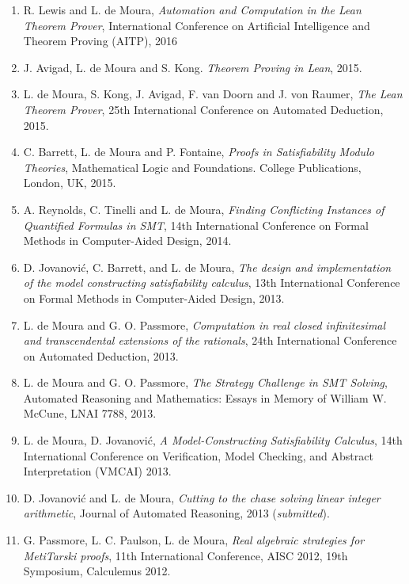 \documentclass{article}
\begin{document}
\begin{enumerate}
\item R. Lewis and L. de Moura,
      {\em Automation and Computation in the Lean Theorem Prover},
      International Conference on Artificial Intelligence and Theorem Proving (AITP), 2016

\item J. Avigad, L. de Moura and S. Kong.
      {\em Theorem Proving in Lean}, 2015.

\item L. de Moura, S. Kong, J. Avigad, F. van Doorn and J. von Raumer,
      {\em  The Lean Theorem Prover},
      25th International Conference on Automated Deduction, 2015.

\item C. Barrett, L. de Moura and P. Fontaine,
  {\em Proofs in Satisfiability Modulo Theories},
  Mathematical Logic and Foundations. College Publications, London, UK, 2015.

\item A. Reynolds, C. Tinelli and L. de Moura,
  {\em Finding Conflicting Instances of Quantified Formulas in SMT},
  14th International Conference on Formal Methods in Computer-Aided Design, 2014.

\item D. Jovanovi\'{c}, C. Barrett, and L. de Moura,
  {\em The design and implementation of the model constructing satisfiability calculus},
13th International Conference on Formal Methods in Computer-Aided Design, 2013.

\item L. de Moura and G. O. Passmore,
  {\em Computation in real closed infinitesimal and transcendental extensions of the rationals},
24th International Conference on Automated Deduction, 2013.

\item L. de Moura and G. O. Passmore,
{\em The Strategy Challenge in SMT Solving},
Automated Reasoning and Mathematics: Essays in Memory of William W. McCune,
LNAI 7788, 2013.

\item L. de Moura, D. Jovanovi\'{c},
      {\em A Model-Constructing Satisfiability Calculus},
14th International Conference on Verification, Model Checking, and Abstract Interpretation (VMCAI) 2013.

\item D. Jovanovi\'{c} and L. de Moura,
      {\em Cutting to the chase solving linear integer arithmetic},
Journal of Automated Reasoning, 2013 ({\em submitted}).

\item G. Passmore, L. C. Paulson, L. de Moura,
{\em Real algebraic strategies for MetiTarski proofs},
11th International Conference, AISC 2012, 19th Symposium, Calculemus 2012.


\end{enumerate}
\end{document}
